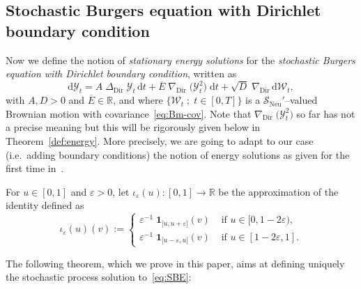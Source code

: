 \documentclass[AHL,Unicode,longabstracts]{cedram}
\DeclareMathOperator{\Dir}{Dir}
\DeclareMathOperator{\Neu}{Neu}
\newcommand{\bb}[1]{{\mathbb #1}}
\newcommand{\mc}[1]{{\mathcal #1}}
\renewcommand{\mc}[1]{{\mathcal #1}}
\newcommand{\SN}{\ensuremath{\mc S_{\Neu}}}
\renewcommand{\bar}{\overline}
\newcommand*{\dd}{\mathrm{d}}
\newcommand*{\dt}{\dd t}
\begin{document}
\subsection{Stochastic Burgers equation with Dirichlet boundary condition} \label{ssec:SBE}
Now we define the notion of \emph{stationary energy solutions} for the \emph{stochastic Burgers equation with Dirichlet boundary condition}, written as
\begin{equation}\label{eq:SBE}
\dd\mathcal Y_t = A \; \Delta_{\Dir}\; \mathcal Y_t\,\dt + \bar E\;\nabla_{\Dir}\; \big(\mathcal{Y}_t^2 \big) \;\dt + \sqrt{D}\; \nabla_{\Dir}\,\dd\mc W_t,
\end{equation}
with $A,D > 0$ and $\bar E \in \bb R$, and where $\{\mc W_t\; ; \; t\in[0,T]\}$ is a $\SN'$--valued Brownian motion with covariance~\eqref{eq:Bm-cov}. Note that $\nabla_{\Dir}\; \big(\mathcal{Y}_t^2 \big)$ so far has not a precise meaning but this will be rigorously given below in Theorem~\ref{def:energy}. More precisely, we are going to adapt to our case (i.e.~adding boundary conditions) the notion of energy solutions as given for the first time in~\cite{gj2014, Gubinelli2013}.

\begin{defi}\label{def:approx}
For $u\in[0,1]$ and $\varepsilon>0$, let $\iota_\varepsilon(u): [0,1]\to \bb R$ be the approximation of the identity defined as
\[
\iota_\varepsilon(u)(v):=
\begin{cases} \varepsilon^{-1} \; \mathbf{1}_{]u,u+\varepsilon]}(v) & \text{ if } u \in [0, 1 - 2
\varepsilon), \\
\varepsilon^{-1}\; \mathbf{1}_{[u-\varepsilon,u[}(v) & \text{ if } u \in [1 - 2
\varepsilon, 1].
\end{cases}
\]
\end{defi}

The following theorem, which we prove in this paper, aims at defining uniquely the stochastic process solution to~\eqref{eq:SBE}:
\end{document}
